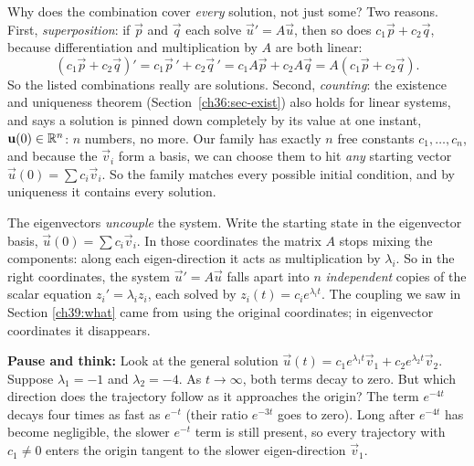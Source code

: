 \begin{whybox}
Why does the combination cover \emph{every} solution, not just some? Two
reasons. First, \emph{superposition}: if $\vec p$ and
$\vec q$ each solve $\vec u' = A\vec u$, then so does $c_1\vec p + c_2\vec q$,
because differentiation and multiplication by $A$ are both linear:
\[
  (c_1\vec p + c_2\vec q)' = c_1\vec p\,' + c_2\vec q\,' = c_1 A\vec p + c_2 A\vec q =
  A(c_1\vec p + c_2\vec q).
\]
So the listed combinations really are solutions.
Second, \emph{counting}: the existence and uniqueness theorem
(Section~\ref{ch36:sec-exist}) also holds for linear systems, and
says a solution is pinned down completely by its value at one instant, $\mathbf{u}(0)\in\mathbb{R}^n$: $n$ numbers, no more. Our family has exactly
$n$ free constants $c_1,\dots,c_n$, and because the $\vec v_i$ form a basis,
we can choose them to hit \emph{any} starting vector $\vec u(0) = \sum c_i\vec v_i$.
So the family matches every possible initial condition, and by uniqueness it
contains every solution.
\end{whybox}

\begin{happeningbox}
The eigenvectors \emph{uncouple} the
system. Write the starting state in the eigenvector basis, $\vec u(0) = \sum c_i
\vec v_i$. In those coordinates the matrix $A$ stops mixing the components:
along each eigen-direction it acts as multiplication by $\lambda_i$. So in
the right coordinates, the system $\vec u' = A\vec u$ falls apart into
$n$ \emph{independent} copies of the scalar equation $z_i' = \lambda_i z_i$, each
solved by $z_i(t) = c_i e^{\lambda_i t}$. The coupling we saw in Section
\ref{ch39:what} came from using the original coordinates; in eigenvector
coordinates it disappears.
\end{happeningbox}

\begin{walkbox}
\textbf{Pause and think:} Look at the general solution
$\vec u(t) = c_1 e^{\lambda_1 t}\vec v_1 + c_2 e^{\lambda_2 t}\vec v_2$.
Suppose $\lambda_1 = -1$ and $\lambda_2 = -4$. As $t \to \infty$, both terms decay to
zero. But which direction does the trajectory follow as it approaches the origin?
The term $e^{-4t}$ decays four times as fast as $e^{-t}$ (their ratio
$e^{-3t}$ goes to zero). Long after $e^{-4t}$
has become negligible, the slower $e^{-t}$ term is still present,
so every trajectory with $c_1\neq 0$ enters the origin tangent to the
slower eigen-direction $\vec v_1$.
\end{walkbox}

